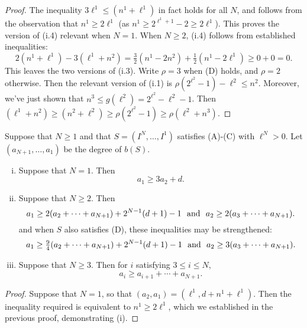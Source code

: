 \documentclass[10pt]{article}
\begin{document}
\begin{KoszulSequenceCombinatorics}
\begin{proof}
The inequality $3\ell^1\leq(n^1+\ell^1)$ in fact holds for all $N$, and follows from the observation that $n^1\geq2\ell^1$ (as $n^1\geq 2^{\ell^1+1}-2\geq 2\ell^1$). This proves the version of \textup{(i.4)} relevant when $N=1$. When $N\geq2$, \textup{(i.4)} follows from established inequalities:
\[2(n^1+\ell^1)-3(\ell^1+n^2)=\tfrac{3}{2}(n^1-2n^2)+\tfrac{1}{2}(n^1-2\ell^1)\geq0+0=0.\]
This leaves the two versions of \textup{(i.3)}. Write $\rho=3$ when \textup{(D)} holds, and $\rho=2$ otherwise. Then
the relevant version of \textup{(i.1)} is $\rho(2^{\ell^2}-1)-\ell^2\leq n^2$. Moreover, we've just shown that $n^3\leq g(\ell^2)=2^{\ell^2}-\ell^2-1$.
Then $(\ell^1+n^2)\geq (n^2+\ell^2)\geq\rho(2^{\ell^2}-1)\geq\rho(\ell^2+n^3)$.
\end{proof}
\begin{prop}
Suppose that $N\geq1$ and that $S=(I^N,\ldots,I^1)$ satisfies \textup{(A)}-\textup{(C)} with $\ell^N>0$. Let $(a_{N+1},\ldots,a_1)$ be the degree of $b(S)$.
\begin{enumerate}[i)]
\setlength{\parindent}{.25in}
\squishlist
\item Suppose that $N=1$. Then
\[a_1\geq3a_2+d.\]
\item Suppose that $N\geq2$. Then 
\[a_1\geq2(a_2+\cdots +a_{N+1})+2^{N-1}(d+1)-1\textup{ \ and \ }a_2\geq2(a_3+\cdots +a_{N+1}).\]
and when $S$ also satisfies \textup{(D)}, these inequalities may be strengthened:
\[a_1\geq\tfrac{9}{4}(a_2+\cdots +a_{N+1})+2^{N-1}(d+1)-1\textup{ \ and \ }a_2\geq3(a_3+\cdots +a_{N+1}).\]
\item Suppose that $N\geq3$. Then for $i$ satisfying $3\leq i\leq N$,
\[a_i\geq a_{i+1}+\cdots +a_{N+1}.\]
\end{enumerate}
\end{prop}
\begin{proof}
Suppose that $N=1$, so that $(a_2,a_1)=(\ell^1,d+n^1+\ell^1)$. Then the inequality required is equivalent to $n^1\geq2\ell^1$, which we established in the previous proof, demonstrating (i).


\end{proof}
\end{KoszulSequenceCombinatorics}
\end{document}
